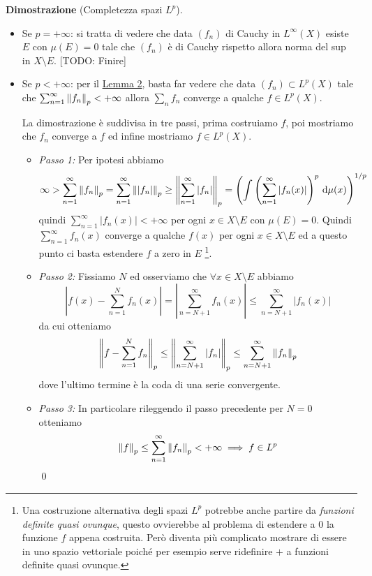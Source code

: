 \textbf{Dimostrazione} (Completezza spazi $L^p$).
\begin{itemize}
	\item 
		Se $p = +\infty$: si tratta di vedere che data $(f_n)$ di Cauchy in $L^\infty(X)$ esiste $E$ con $\mu(E) = 0$ tale che $(f_n)$ è di Cauchy rispetto allora norma del sup in $X \setminus E$. [TODO: Finire]

	\item 
		Se $p < +\infty$: per il \hyperlink{prop:completeness_lemma_2}{Lemma 2}, basta far vedere che data $(f_n) \subset L^p(X)$ tale che $\sum_{n=1}^\infty \left\lVert f_n \right\rVert_p < +\infty$ allora $\sum_n f_n$ converge a qualche $f \in L^p(X)$.

		La dimostrazione è suddivisa in tre passi, prima costruiamo $f$, poi mostriamo che $f_n$ converge a $f$ ed infine mostriamo $f \in L^p(X)$.

		\begin{itemize}
			\item 
				\textit{Passo 1:} 
				Per ipotesi abbiamo
				$$
				\infty 
				> \sum_{n=1}^\infty \left\lVert f_n \right\rVert_p 
				= \sum_{n=1}^\infty \left\lVert |f_n| \right\rVert_p 
				\geq \left\lVert \sum_{n=1}^\infty |f_n| \right\rVert_p 
				= \left( \int \left( \sum_{n=1}^\infty |f_n(x)| \right)^p \,\mathrm{d} \mu(x) \right)^{1/p}
				$$
				quindi $\sum_{n=1}^\infty |f_n(x)| < +\infty$ per ogni $x \in X \setminus E$ con $\mu(E) = 0$. Quindi $\sum_{n=1}^\infty f_n(x)$ converge a qualche $f(x)$ per ogni $x \in X \setminus E$ ed a questo punto ci basta estendere $f$ a zero in $E$ \footnote{Una costruzione alternativa degli spazi $L^p$ potrebbe anche partire da \textit{funzioni definite quasi ovunque}, questo ovvierebbe al problema di estendere a $0$ la funzione $f$ appena costruita. Però diventa più complicato mostrare di essere in uno spazio vettoriale poiché per esempio serve ridefinire $+$ a funzioni definite quasi ovunque.}.
			
			\item 
				\textit{Passo 2:}
				Fissiamo $N$ ed osserviamo che $\forall x \in X \setminus E$ abbiamo
				$$
				\left| f(x) - \sum_{n=1}^N f_n(x) \right| 
				= \left| \sum_{n=N+1}^\infty f_n(x) \right| 
				\leq \sum_{n=N+1}^\infty |f_n(x)|
				$$
				da cui otteniamo
				$$
				\left\lVert f - \sum_{n=1}^N f_n \right\rVert_p 
				\leq \left\lVert \sum_{n=N+1}^\infty |f_n| \right\rVert_p
				\leq \sum_{n=N+1}^\infty \left\lVert f_n \right\rVert_p
				$$
				dove l'ultimo termine è la coda di una serie convergente.
			
			\item 
				\textit{Passo 3:}
				In particolare rileggendo il passo precedente per $N = 0$ otteniamo
				$$
				\left\lVert f \right\rVert_p \leq \sum_{n=1}^\infty \left\lVert f_n \right\rVert_p < +\infty \implies f \in L^p
				$$
				\qed

		\end{itemize}
\end{itemize}

